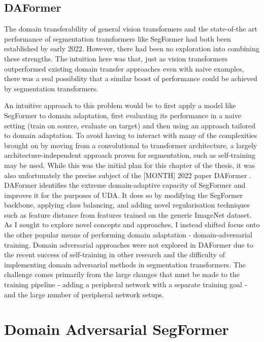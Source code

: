 \documentclass[a4paper,12pt]{report}
\begin{document}
\subsection*{DAFormer}

The domain transferability of general vision transformers and the state-of-the art performance of segmentation transformers like SegFormer \cite{xie_segformer_2021} had both been established by early 2022. However, there had been no exploration into combining these strengths.
The intuition here was that, just as vision transformers outperformed existing domain transfer approaches even with naive examples, there was a real possibility that a similar boost of performance could be achieved by segmentation transformers.

An intuitive approach to this problem would be to first apply a model like SegFormer to domain adaptation, first evaluating its performance in a naive setting (train on source, evaluate on target) and then using an approach tailored to domain adaptation. To avoid having to interact with many of the complexities brought on by moving from a convolutional to transformer architecture, a largely architecture-independent approach proven for segmentation, such as self-training \cite{zou_domain_2018} may be used. While this was the initial plan for this chapter of the thesis, it was also unfortunately the precise subject of the [MONTH] 2022 paper DAFormer \cite{hoyer_daformer_2022}. DAFormer identifies the extreme domain-adaptive capacity of SegFormer and improves it for the purposes of UDA. It does so by modifying the SegFormer backbone, applying class balancing, and adding novel regularisation techniques such as feature distance from features trained on the generic ImageNet dataset. As I sought to explore novel concepts and approaches, I instead shifted focus onto the other popular means of performing domain adaptation - domain-adversarial training. Domain adversarial approaches were not explored in DAFormer due to the recent success of self-training in other research and the difficulty of implementing domain adversarial methods in segmentation transformers. The challenge comes primarily from the large changes that must be made to the training pipeline - adding a peripheral network with a separate training goal - and the large number of peripheral network setups.

\section{Domain Adversarial SegFormer}
\end{document}
